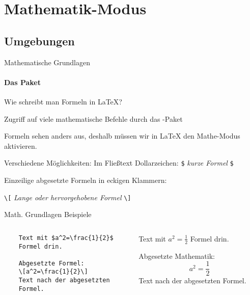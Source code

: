\section{Mathematik-Modus}
\subsection{Umgebungen}
\begin{frame}[fragile]{Mathematische Grundlagen}
\framesubtitle{Das Paket }
Wie schreibt man Formeln in \LaTeX{}?

\medskip\pause
Zugriff auf viele mathematische Befehle durch das -Paket

\medskip\pause
Formeln sehen anders aus, deshalb müssen wir in \LaTeX{} den Mathe-Modus aktivieren.

\medskip\pause
Verschiedene Möglichkeiten: Im Fließtext Dollarzeichen: \texttt{\$} \emph{kurze Formel} \texttt{\$}

Einzeilige abgesetzte Formeln in eckigen Klammern: 
\begin{center}
\texttt{\textbackslash[} \emph{Lange oder hervorgehobene Formel} \texttt{\textbackslash]}
\end{center}
\end{frame}

\begin{frame}[fragile]{Math. Grundlagen Beispiele}
\begin{columns}
\begin{column}{.48\textwidth}\footnotesize
\begin{codeblock}
\begin{verbatim}
	Text mit $a^2=\frac{1}{2}$
	Formel drin.

	Abgesetzte Formel:
	\[a^2=\frac{1}{2}\]
	Text nach der abgesetzten
	Formel.
\end{verbatim}
\end{codeblock}
\end{column}
%
\begin{column}{.45\textwidth}	\pause	
	Text mit $a^2=\frac{1}{2}$ Formel drin.
    
    \pause
	Abgesetzte Mathematik:
	\[a^2=\frac{1}{2}\]
	Text nach der abgesetzten Formel.
\end{column}
\end{columns}
\end{frame}





